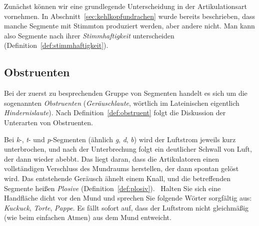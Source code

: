 Zunächst können wir eine grundlegende Unterscheidung in der Artikulationsart vornehmen.
In Abschnitt~\ref{sec:kehlkopfundrachen} wurde bereits beschrieben, dass manche Segmente mit Stimmton produziert werden, aber andere nicht.
Man kann also Segmente nach ihrer \textit{Stimmhaftigkeit} unterscheiden (Definition~\ref{def:stimmhaftigkeit}).


\subsection{Obstruenten}
\label{sec:obstruenten}

Bei der zuerst zu besprechenden Gruppe von Segmenten handelt es sich um die sogenannten \textit{Obstruenten} (\textit{Geräuschlaute}, wörtlich im Lateinischen eigentlich \textit{Hindernislaute}).
Nach Definition~\ref{def:obstruent} folgt die Diskussion der Unterarten von Obstruenten.


Bei \textit{k}-, \textit{t}- und \textit{p}-Segmenten (ähnlich \textit{g}, \textit{d}, \textit{b}) wird der Luftstrom jeweils kurz unterbrochen, und nach der Unterbrechung folgt ein deutlicher Schwall von Luft, der dann wieder abebbt.
Das liegt daran, dass die Artikulatoren einen vollständigen Verschluss des Mundraums herstellen, der dann spontan gelöst wird.
Das entstehende Geräusch ähnelt einem Knall, und die betreffenden Segmente heißen \textit{Plosive} (Definition~\ref{def:plosiv}).
\TuBegin~Halten Sie sich eine Handfläche dicht vor den Mund und sprechen Sie folgende Wörter sorgfältig aus: \textit{Kuckuck}, \textit{Torte}, \textit{Pappe}.
Es fällt sofort auf, dass der Luftstrom nicht gleichmäßig (wie beim einfachen Atmen) aus dem Mund entweicht.


